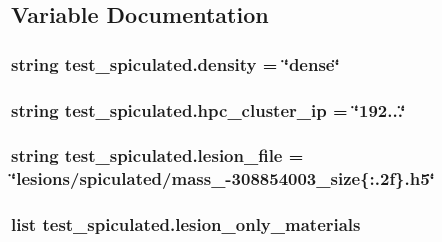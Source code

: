 \subsection{Variable Documentation}
\hypertarget{namespacetest__spiculated_a058a57e76535b7d35038bffbda8fda91}{
\subsubsection[{density}]{\setlength{\rightskip}{0pt plus 5cm}string test\-\_\-spiculated.\-density = \char`\"{}dense\char`\"{}}}\label{namespacetest__spiculated_a058a57e76535b7d35038bffbda8fda91}
\hypertarget{namespacetest__spiculated_aff5d6f1f85c625e33f5d9c0781bdcabf}{
\subsubsection[{hpc\-\_\-cluster\-\_\-ip}]{\setlength{\rightskip}{0pt plus 5cm}string test\-\_\-spiculated.\-hpc\-\_\-cluster\-\_\-ip = \char`\"{}192...\char`\"{}}}\label{namespacetest__spiculated_aff5d6f1f85c625e33f5d9c0781bdcabf}
\hypertarget{namespacetest__spiculated_ac19b4dd28e8af37f75bf2ec1ecb23c62}{
\subsubsection[{lesion\-\_\-file}]{\setlength{\rightskip}{0pt plus 5cm}string test\-\_\-spiculated.\-lesion\-\_\-file = \char`\"{}lesions/spiculated/mass\-\_\--\/308854003\-\_\-size\{\-:.\-2f\}.\-h5\char`\"{}}}\label{namespacetest__spiculated_ac19b4dd28e8af37f75bf2ec1ecb23c62}
\hypertarget{namespacetest__spiculated_ab3f4da20a41fe314d5da3e3ded84fc6f}{
\subsubsection[{lesion\-\_\-only\-\_\-materials}]{\setlength{\rightskip}{0pt plus 5cm}list test\-\_\-spiculated.\-lesion\-\_\-only\-\_\-materials}}\label{namespacetest__spiculated_ab3f4da20a41fe314d5da3e3ded84fc6f}
